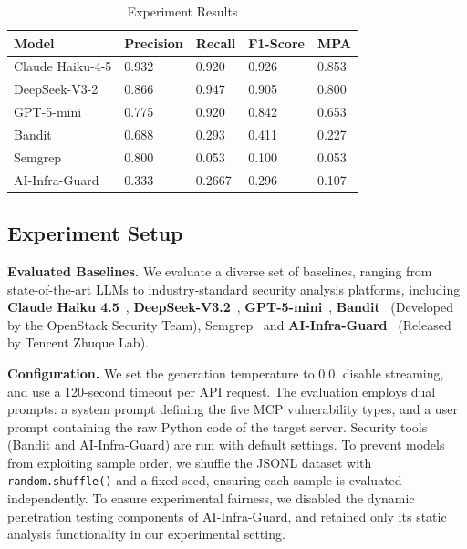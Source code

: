 \begin{table}[!t]
\centering
\small\caption{Experiment Results}
\vspace{-10pt}
    \begin{tabular}{m{2cm}m{1.5cm}m{1.5cm}m{1cm}m{1cm}}
\toprule
\textbf{Model} & \textbf{Precision} & \textbf{Recall} & \textbf{F1-Score} & \textbf{MPA} \\
\midrule
Claude Haiku-4-5 & 0.932 & 0.920 & 0.926 & 0.853 \\
DeepSeek-V3-2 & 0.866 & 0.947 & 0.905 & 0.800\\
GPT-5-mini & 0.775 & 0.920 & 0.842 & 0.653 \\
Bandit & 0.688 & 0.293 & 0.411 & 0.227\\
Semgrep & 0.800 & 0.053 & 0.100 & 0.053\\
AI-Infra-Guard & 0.333 & 0.2667 & 0.296 & 0.107\\
\bottomrule
\end{tabular}

\label{tab:eva}
\end{table}




\subsection{Experiment Setup}

\textbf{Evaluated Baselines.} We evaluate a diverse set of baselines, ranging from state-of-the-art LLMs to industry-standard security analysis platforms, including \textbf{Claude Haiku 4.5}~\cite{claude}, \textbf{DeepSeek-V3.2}~\cite{DeepSeekAI2025DeepSeekV32PT}, \textbf{GPT-5-mini}~\cite{gpt5mini}, \textbf{Bandit}~\cite{badit} (Developed by the OpenStack Security Team), Semgrep~\cite{semgrep} and \textbf{AI-Infra-Guard}~\cite{aiinfraguard} (Released by Tencent Zhuque Lab).

\textbf{Configuration.} We set the generation temperature to 0.0, disable streaming, and use a 120-second timeout per API request. The evaluation employs dual prompts: a system prompt defining the five MCP vulnerability types, and a user prompt containing the raw Python code of the target server. Security tools (Bandit and AI-Infra-Guard) are run with default settings. To prevent models from exploiting sample order, we shuffle the JSONL dataset with \texttt{random.shuffle()} and a fixed seed, ensuring each sample is evaluated independently. To ensure experimental fairness, we disabled the dynamic penetration testing components of AI-Infra-Guard, and retained only its static analysis functionality in our experimental setting.



